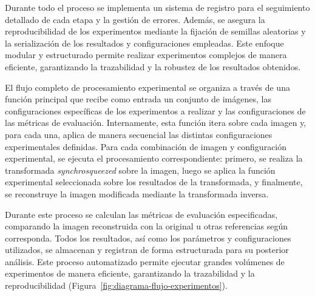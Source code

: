 Durante todo el proceso se implementa un sistema de registro para el seguimiento detallado de cada etapa y la gestión de errores. Además, se asegura la reproducibilidad de los experimentos mediante la fijación de semillas aleatorias y la serialización de los resultados y configuraciones empleadas. Este enfoque modular y estructurado permite realizar experimentos complejos de manera eficiente, garantizando la trazabilidad y la robustez de los resultados obtenidos.

El flujo completo de procesamiento experimental se organiza a través de una función principal que recibe como entrada un conjunto de imágenes, las configuraciones específicas de los experimentos a realizar y las configuraciones de las métricas de evaluación. Internamente, esta función itera sobre cada imagen y, para cada una, aplica de manera secuencial las distintas configuraciones experimentales definidas. Para cada combinación de imagen y configuración experimental, se ejecuta el procesamiento correspondiente: primero, se realiza la transformada \textit{synchrosqueezed} sobre la imagen, luego se aplica la función experimental seleccionada sobre los resultados de la transformada, y finalmente, se reconstruye la imagen modificada mediante la transformada inversa.

Durante este proceso se calculan las métricas de evaluación especificadas, comparando la imagen reconstruida con la original u otras referencias según corresponda. Todos los resultados, así como los parámetros y configuraciones utilizados, se almacenan y registran de forma estructurada para su posterior análisis. Este proceso automatizado permite ejecutar grandes volúmenes de experimentos de manera eficiente, garantizando la trazabilidad y la reproducibilidad (Figura~\ref{fig:diagrama-flujo-experimentos}).

